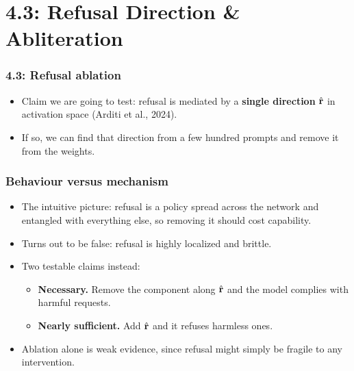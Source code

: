 %

\section{4.3: Refusal Direction \& Abliteration}

\begin{frame}
\frametitle{4.3: Refusal ablation}
\begin{itemize}
    \item Claim we are going to test: refusal is mediated by a
    \textbf{single direction} $\hat{\mathbf{r}}$ in activation space (Arditi et al., 2024).
    \item If so, we can find that direction from a few hundred prompts and
    remove it from the weights.
\end{itemize}
\end{frame}

\begin{frame}
\frametitle{Behaviour versus mechanism}
\begin{itemize}
    \item The intuitive picture: refusal is a policy spread across the network
    and entangled with everything else, so removing it should cost capability.
    \item Turns out to be false: refusal is highly localized and brittle.
    \item Two testable claims instead:
    \begin{itemize}
        \item \textbf{Necessary.} Remove the component along $\hat{\mathbf{r}}$ and the
        model complies with harmful requests.
        \item \textbf{Nearly sufficient.} Add $\hat{\mathbf{r}}$ and it refuses harmless
        ones.
    \end{itemize}
    \item Ablation alone is weak evidence, since
    refusal might simply be fragile to any intervention.
\end{itemize}
\end{frame}


